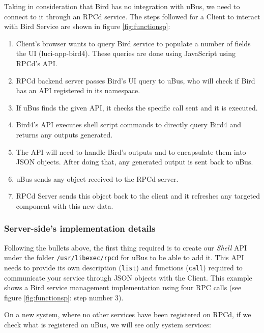 Taking in consideration that Bird has no integration with uBus, we need to connect to it through an RPCd service. The steps followed for a Client to interact with Bird Service are shown in figure \ref{fig:functionsp}:
\begin{enumerate}
    \item Client's browser wants to query Bird service to populate a number of fields the UI (luci-app-bird4). These queries are done using JavaScript using RPCd's API.
    \item RPCd backend server passes Bird's UI query to uBus, who will check if Bird has an API registered in  its namespace.
    \item If uBus finds the given API, it checks the specific call sent and it is executed.
    \item Bird4's API executes shell script commands to directly query Bird4 and returns any outputs generated.
    \item The API will need to handle Bird's outputs and to encapsulate them into JSON objects. After doing that, any generated output is sent back to uBus.
    \item uBus sends any object received to the RPCd server.
    \item RPCd Server sends this object back to the client and it refreshes any targeted component with this new data.
\end{enumerate}

\subsubsection{Server-side's implementation details}
Following the bullets above, the first thing required is to create our \textit{Shell} API under the folder \texttt{/usr/libexec/rpcd} for uBus to be able to add it. This API needs to provide its own description (\texttt{list}) and functions (\texttt{call}) required to communicate your service through JSON objects with the Client. This example shows a Bird service management implementation using four RPC calls (see figure \ref{fig:functionsp}: step number 3).



On a new system, where no other services have been registered on RPCd, if we check what is registered on uBus, we will see only system services:

